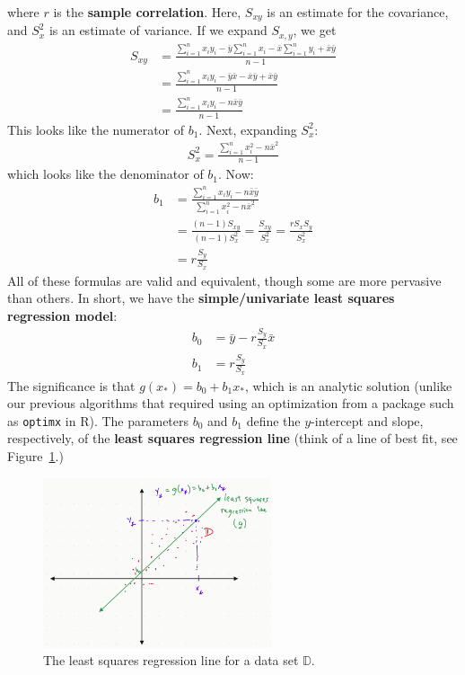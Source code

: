 \documentclass[12pt, a4paper]{article}
\theoremstyle{definition}
\begin{document}
	where $r$ is the \textbf{sample correlation}. Here, $S_{xy}$ is an estimate for the covariance,
	and $S_x^2$ is an estimate of variance. If we expand $S_{x,y}$, we get
	\begin{align*}
		S_{xy} &= \frac{\sum_{i=1}^{n}x_iy_i-\bar{y}\sum_{i=1}^{n}x_i-\bar{x}\sum_{i=1}^{n}y_i+\bar{x}\bar{y}}{n-1}\\
		&=\frac{\sum_{i=1}^{n}x_iy_i-\bar{y}\bar{x}-\bar{x}\bar{y}+\bar{x}\bar{y}}{n-1}\\
		&=\frac{\sum_{i=1}^{n}x_iy_i-n\bar{x}\bar{y}}{n-1}
	\end{align*}
	This looks like the numerator of $b_1$. Next, expanding $S_x^2$:
	\begin{align*}
		S_x^2 = \frac{\sum_{i=1}^{n}x_i^2 - n\bar{x}^2}{n-1}
	\end{align*}
	which looks like the denominator of $b_1$. Now:
	\begin{align*}
		b_1 &= \frac{\sum_{i=1}^{n}x_iy_i-n\bar{x}\bar{y}}{\sum_{i=1}^{n}x_i^2-n\bar{x}^2}\\
		&=\frac{(n-1)S_{xy}}{(n-1)S_x^2}
		=\frac{S_{xy}}{S_{x}^2}
		=\frac{rS_xS_y}{S_x^2}\\
		&=r\frac{S_y}{S_x}
	\end{align*}
	All of these formulas are valid and equivalent, though some are more pervasive than others. In short,
	we have the \textbf{simple/univariate least squares regression model}:
	\begin{align}
		b_0 &= \bar{y}-r\frac{S_y}{S_x}\bar{x}\\
		b_1 &= r\frac{S_y}{S_x}
	\end{align}
	The significance is that $g(x_*) = b_0 + b_1x_*$, which is an analytic solution
	(unlike our previous algorithms that required using an optimization from
	a package such as \texttt{optimx} in R). The parameters $b_0$ and $b_1$ define
	the $y$-intercept and slope, respectively, of the \textbf{least squares regression line}
	(think of a line of best fit, see Figure~\ref{fig:line-best-fit}.)
	\begin{figure}
		\centering
		\includegraphics[width=0.6\textwidth]{least-squares-regression-line}
		\caption{The least squares regression line for a data set $\mathbb{D}$.}
		\label{fig:line-best-fit}
	\end{figure}
\end{document}
